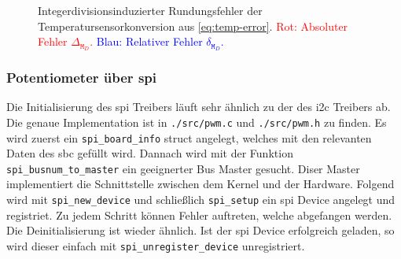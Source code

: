 \begin{figure}[h]
    \centering
    \caption[Integerdivisionsinduzierter Rundungsfehler]{Integerdivisionsinduzierter Rundungsfehler der Temperatursensorkonversion aus \autoref{eq:temp-error}.
    \textcolor{red}{Rot: Absoluter Fehler $\Delta_{\texttt{M}_D}$.}
    \textcolor{blue}{Blau: Relativer Fehler $\delta_{\texttt{M}_D}$.}
    }
    \label{fig:rounding-err}
\end{figure}

\subsubsection{Potentiometer über \acrshort{spi}}

Die Initialisierung des \gls{spi} Treibers läuft sehr ähnlich zu der des \gls{i2c} Treibers ab.
Die genaue Implementation ist in \texttt{./src/pwm.c} und \texttt{./src/pwm.h} zu finden.
Es wird zuerst ein \texttt{spi\_board\_info} struct angelegt, welches mit den relevanten Daten des \gls{sbc} gefüllt wird.
Dannach wird mit der Funktion \texttt{spi\_busnum\_to\_master} ein geeignerter Bus Master gesucht.
Diser Master implementiert die Schnittstelle zwischen dem Kernel und der Hardware.
Folgend wird mit \texttt{spi\_new\_device} und schließlich \texttt{spi\_setup} ein \gls{spi} Device angelegt und registriet.
Zu jedem Schritt können Fehler auftreten, welche abgefangen werden.
Die Deinitialisierung ist wieder ähnlich.
Ist der \gls{spi} Device erfolgreich geladen, so wird dieser einfach mit \texttt{spi\_unregister\_device} unregistriert.

